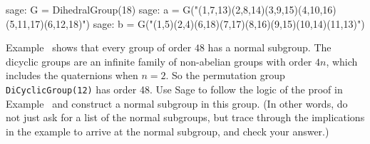 %
\begin{sageexample}
sage: G = DihedralGroup(18)
sage: a = G("(1,7,13)(2,8,14)(3,9,15)(4,10,16)(5,11,17)(6,12,18)")
sage: b = G("(1,5)(2,4)(6,18)(7,17)(8,16)(9,15)(10,14)(11,13)")
\end{sageexample}
%
\begin{sageverbatim}\end{sageverbatim}
%
%
Example~ shows that every group of order $48$ has a normal subgroup.  The dicyclic groups are an infinite family of non-abelian groups with order $4n$, which includes the quaternions when $n=2$.  So the permutation group \verb?DiCyclicGroup(12)? has order 48.  Use Sage to follow the logic of the proof in Example~ and construct a normal subgroup in this group.  (In other words, do not just ask for a list of the normal subgroups, but trace through the implications in the example to arrive at the normal subgroup, and check your answer.)
\begin{sageverbatim}\end{sageverbatim}
%

